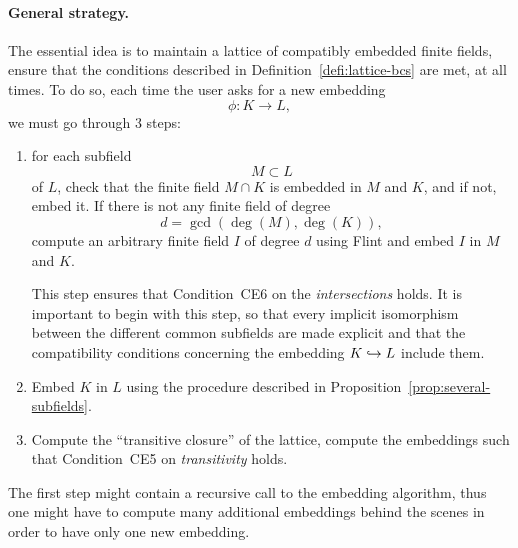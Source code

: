 \paragraph{General strategy.} The essential idea is to maintain a lattice of
compatibly embedded finite fields, \ie ensure that the conditions described in
Definition~\ref{defi:lattice-bcs} are met, at all
times. To do so, each time the user asks for a new embedding
\[
  \phi:K\to L,
\]
we must go through $3$ steps:
\begin{enumerate}
  \item for each subfield 
    \[
      M\subset L
    \]
    of $L$, check that the finite field $M\cap K$ is 
    embedded in $M$ and $K$, and if not, embed it. If there is not
    any finite field of degree 
    \[
      d=\gcd(\deg(M), \deg (K)),
  \]
    compute an
    arbitrary finite field $I$ of degree $d$ using Flint
    and embed $I$ in $M$ and $K$.
    \begin{center}
    \end{center}
    This step ensures that Condition~CE6 on the
    \emph{intersections} holds. It is important to begin with this step, so
    that every implicit isomorphism between the different common subfields are
    made explicit and that the compatibility conditions concerning the
    embedding $K\hookrightarrow L$ include them.
  \item Embed $K$ in $L$ using the procedure described in
    Proposition~\ref{prop:several-subfields}.
  \item Compute the ``transitive closure'' of the lattice, \ie compute the
    embeddings such that Condition~CE5 on \emph{transitivity} holds. 
\end{enumerate}
The first step might contain a recursive call to the embedding algorithm, thus
one might have to compute many additional embeddings behind the scenes in order
to have only one new embedding. 
%

